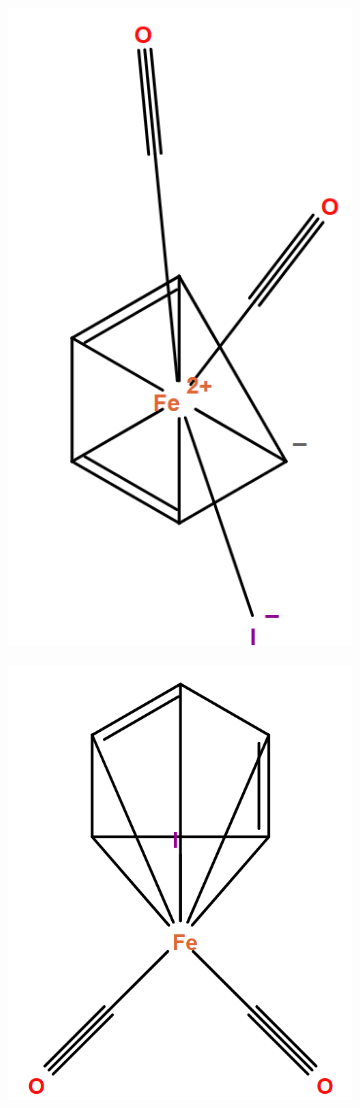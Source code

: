 \begin{figure}[h]
\centering
\begin{subfigure}{.35\textwidth}
  \centering
  \includegraphics[width=.45\linewidth]{imagenes/resultados/evolucion_iron_a.png}
  \caption{}
\end{subfigure}%
\begin{subfigure}{.35\textwidth}
  \centering
  \includegraphics[width=.6\linewidth]{imagenes/resultados/evolucion_iron_b.png}
  \caption{}
\end{subfigure}%
\\
\begin{subfigure}{.35\textwidth}

\end{subfigure}
\end{figure}
